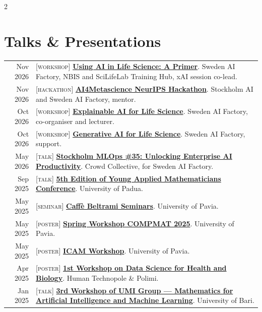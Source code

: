 \documentclass[lighthipster]{simplehipstercv}
\begin{document}
\begin{paracol}{2}
\begin{minipage}[t]{0.71\textwidth}
\section*{Talks \& Presentations}
\begin{tabular}{r p{}}
    Nov 2026 & [\textsc{workshop}] \href{https://scilifelab-training.github.io/using-ai-in-lifescience/2611/}{\textbf{Using AI in Life Science: A Primer}}. Sweden AI Factory, NBIS and SciLifeLab Training Hub, xAI session co-lead. \\
    Nov 2026 & [\textsc{hackathon}] \href{https://swedenaifactory.se/event/ai-for-meta-science-hackathon-2026/}{\textbf{AI4Metascience NeurIPS Hackathon}}. Stockholm AI and Sweden AI Factory, mentor. \\
    Oct 2026 & [\textsc{workshop}] \href{https://swedenaifactory.se/event/explainable-ai-for-life-science/}{\textbf{Explainable AI for Life Science}}. Sweden AI Factory, co-organiser and lecturer. \\
    Oct 2026 & [\textsc{workshop}] \href{https://swedenaifactory.se/event/generative-ai-for-life-science/}{\textbf{Generative AI for Life Science}}. Sweden AI Factory, support. \\
    May 2026 & [\textsc{talk}] \href{https://ivanqkk.github.io/talks/2026-05-27-stockholm-mlops}{\textbf{Stockholm MLOps \#35: Unlocking Enterprise AI Productivity}}. Crowd Collective, for Sweden AI Factory. \\
    Sep 2025 & [\textsc{talk}] \href{https://ivanqkk.github.io/talks/2025-09-26-yamc}{\textbf{5th Edition of Young Applied Mathematicians Conference}}. University of Padua. \\
    May 2025 & [\textsc{seminar}] \href{https://ivanqkk.github.io/talks/2025-05-26-beltrami}{\textbf{Caffè Beltrami Seminars}}. University of Pavia. \\
    May 2025 & [\textsc{poster}] \href{https://ivanqkk.github.io/talks/2025-05-23-compmat2}{\textbf{Spring Workshop COMPMAT 2025}}. University of Pavia. \\
    May 2025 & [\textsc{poster}] \href{https://ivanqkk.github.io/talks/2025-05-22-icam}{\textbf{ICAM Workshop}}. University of Pavia. \\
    Apr 2025 & [\textsc{poster}] \href{https://ivanqkk.github.io/talks/2025-04-07-human-technopole}{\textbf{1st Workshop on Data Science for Health and Biology}}. Human Technopole \& Polimi. \\
    Jan 2025 & [\textsc{talk}] \href{https://ivanqkk.github.io/talks/2025-01-31-bari}{\textbf{3rd Workshop of UMI Group — Mathematics for Artificial Intelligence and Machine Learning}}. University of Bari. \\

\end{tabular}
\end{minipage}
\end{paracol}
\end{document}
